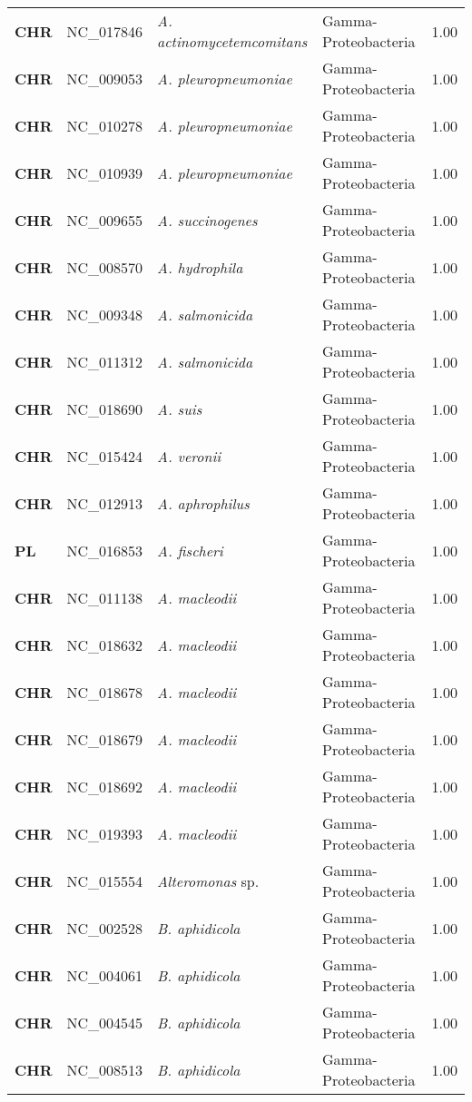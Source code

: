\begin{adjustwidth}{-3cm}{2cm}
{\begin{supertabular}{>{\bfseries}l|p{0.1\textwidth}p{0.14\textwidth}l|l}
CHR & NC\_017846 & \textit{A. actinomycetemcomitans} & Gamma-Proteobacteria & 1.00\\
CHR & NC\_009053 & \textit{A. pleuropneumoniae} & Gamma-Proteobacteria & 1.00\\
CHR & NC\_010278 & \textit{A. pleuropneumoniae} & Gamma-Proteobacteria & 1.00\\
CHR & NC\_010939 & \textit{A. pleuropneumoniae} & Gamma-Proteobacteria & 1.00\\
CHR & NC\_009655 & \textit{A. succinogenes} & Gamma-Proteobacteria & 1.00\\
CHR & NC\_008570 & \textit{A. hydrophila} & Gamma-Proteobacteria & 1.00\\
CHR & NC\_009348 & \textit{A. salmonicida} & Gamma-Proteobacteria & 1.00\\
CHR & NC\_011312 & \textit{A. salmonicida} & Gamma-Proteobacteria & 1.00\\
CHR & NC\_018690 & \textit{A. suis} & Gamma-Proteobacteria & 1.00\\
CHR & NC\_015424 & \textit{A. veronii} & Gamma-Proteobacteria & 1.00\\
CHR & NC\_012913 & \textit{A. aphrophilus} & Gamma-Proteobacteria & 1.00\\
PL & NC\_016853 & \textit{A. fischeri} & Gamma-Proteobacteria & 1.00\\
CHR & NC\_011138 & \textit{A. macleodii} & Gamma-Proteobacteria & 1.00\\
CHR & NC\_018632 & \textit{A. macleodii} & Gamma-Proteobacteria & 1.00\\
CHR & NC\_018678 & \textit{A. macleodii} & Gamma-Proteobacteria & 1.00\\
CHR & NC\_018679 & \textit{A. macleodii} & Gamma-Proteobacteria & 1.00\\
CHR & NC\_018692 & \textit{A. macleodii} & Gamma-Proteobacteria & 1.00\\
CHR & NC\_019393 & \textit{A. macleodii} & Gamma-Proteobacteria & 1.00\\
CHR & NC\_015554 & \textit{Alteromonas} sp. & Gamma-Proteobacteria & 1.00\\
CHR & NC\_002528 & \textit{B. aphidicola} & Gamma-Proteobacteria & 1.00\\
CHR & NC\_004061 & \textit{B. aphidicola} & Gamma-Proteobacteria & 1.00\\
CHR & NC\_004545 & \textit{B. aphidicola} & Gamma-Proteobacteria & 1.00\\
CHR & NC\_008513 & \textit{B. aphidicola} & Gamma-Proteobacteria & 1.00\\

\end{supertabular}}
\end{adjustwidth}
